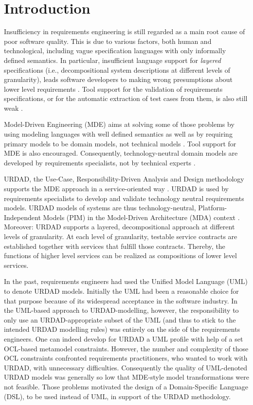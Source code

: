 \section{Introduction}
Insufficiency in requirements engineering is still regarded 
as a main root cause of poor software quality. This is due 
to various factors, both human and technological, including 
vague specification languages with only informally defined 
semantics. In particular, insufficient language support for 
\emph{layered} specifications (i.e., decompositional system 
descriptions at different levels of granularity), leads
software developers to making wrong presumptions about 
lower level requirements \cite{espana_evaluating_2009}. 
Tool support for the validation of requirements specifications, 
or for the automatic extraction of test cases from them, 
is also still weak \cite{bashardoust-tajali_extracting_2008}.

Model-Driven Engineering (MDE) \cite{schmidt_model_2006} aims
at solving some of those problems by using modeling languages 
with well defined semantics as well as by requiring primary 
models to be domain models, not technical models 
\cite{asnina_computation_2010}. Tool support for MDE is also 
encouraged. Consequently, technology-neutral domain models 
are developed by requirements specialists, not by technical 
experts \cite{asnina_computation_2010}.

URDAD, the Use-Case, Responsibility-Driven Analysis and 
Design methodology \cite{fritz_solms_technology_2007} supports 
the MDE approach in a service-oriented way \cite{solms_urdad_2010}. 
URDAD is used by requirements specialists to develop and validate 
technology neutral requirements models. URDAD models of systems
are thus technology-neutral, Platform-Independent Models (PIM) 
in the Model-Driven Architecture (MDA) context \cite{solms_urdad_2010}.
Moreover: URDAD supports a layered, decompositional approach at 
different levels of granularity. At each level of granularity, 
testable service contracts are established together with services 
that fulfill those contracts. Thereby, the functions of higher 
level services can be realized as compositions of lower level 
services.

In the past, requirements engineers had used the Unified 
Model Language (UML) to denote URDAD models. Initially the 
UML had been a reasonable choice for that purpose because 
of its widespread acceptance in the software industry. In 
the UML-based approach to URDAD-modelling, however, the 
responsibility to only use an URDAD-appropriate subset 
of the UML (and thus to stick to the intended URDAD modelling 
rules) was entirely on the side of the requirements engineers. 
One can indeed develop for URDAD a UML profile with help of a 
set OCL-based metamodel constraints. However, the number and 
complexity of those OCL constraints confronted requirements 
practitioners, who wanted to work with URDAD, with unnecessary 
difficulties. Consequently the quality of UML-denoted URDAD 
models was generally so low that MDE-style model transformations 
were not feasible. Those problems motivated the design of a 
Domain-Specific Language (DSL), to be used instead of UML, 
in support of the URDAD methodology.

